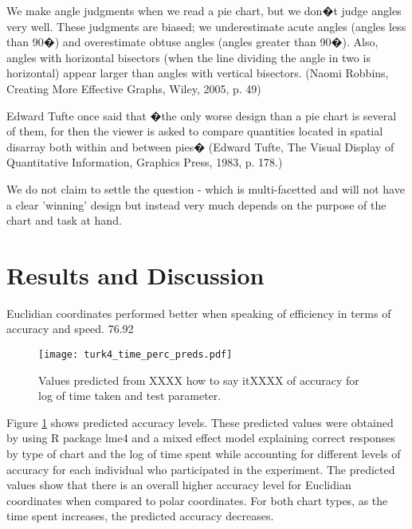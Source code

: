 	
	We make angle judgments when we read a pie chart, but we don�t judge angles very well. These judgments are biased; we underestimate acute angles (angles less than 90�) and overestimate obtuse angles (angles greater than 90�). Also, angles with horizontal bisectors (when the line dividing the angle in two is horizontal) appear larger than angles with vertical bisectors. (Naomi Robbins, Creating More Effective Graphs, Wiley, 2005, p. 49)
	
	 Edward Tufte once said that �the only worse design than a pie chart is several of them, for then the viewer is asked to compare quantities located in spatial disarray both within and between pies� (Edward Tufte, The Visual Display of Quantitative Information, Graphics Press, 1983, p. 178.)

 We do not claim to settle the question - which is multi-facetted and will not have a clear 'winning' design but instead very much depends on the purpose of the chart and task at hand.

\section{Results and Discussion}

Euclidian coordinates performed better when speaking of efficiency in terms of accuracy and speed. 76.92%

\begin{figure}[htbp] %
   \centering
   \texttt{[image: turk4\_time\_perc\_preds.pdf]}  
   \caption{Values predicted from XXXX how to say itXXXX of accuracy for log of time taken and test parameter.}
   \label{accuracy_preds}
\end{figure}

Figure \ref{accuracy_preds} shows predicted accuracy levels. These predicted values were obtained by using R package lme4 and a mixed effect model explaining correct responses by type of chart and the log of time spent while accounting for different levels of accuracy for each individual who participated in the experiment. The predicted values show that there is an overall higher accuracy level for Euclidian coordinates when compared to polar coordinates. For both chart types, as the time spent increases, the predicted accuracy decreases. 



